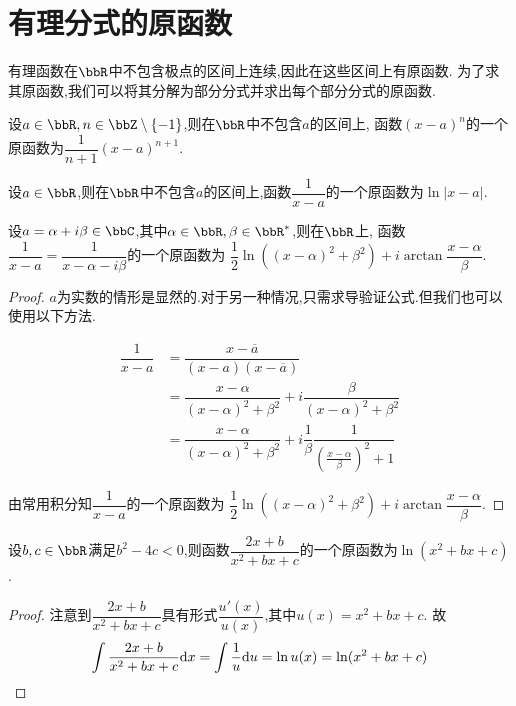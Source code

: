 \section{有理分式的原函数}

有理函数在$\bbR$中不包含极点的区间上连续,因此在这些区间上有原函数.
为了求其原函数,我们可以将其分解为部分分式并求出每个部分分式的原函数.

\begin{prop}
    设$a \in \bbR, n \in \bbZ \setminus \{ -1 \}$,则在$\bbR$中不包含$a$的区间上,
    函数$(x - a)^n$的一个原函数为$\dfrac{1}{n + 1} (x - a)^{n + 1}$.
\end{prop}

\begin{prop}
    设$a \in \bbR$,则在$\bbR$中不包含$a$的区间上,函数$\dfrac{1}{x - a}$的一个原函数为$\ln \lvert x - a \rvert$.
\end{prop}

\begin{prop}
    设$a = \alpha + i \beta \in \bbC$,其中$\alpha \in \bbR, \beta \in \bbR^*$,则在$\bbR$上,
    函数$\dfrac{1}{x - a} = \dfrac{1}{x - \alpha - i \beta}$的一个原函数为
    $\dfrac{1}{2} \ln \left( (x - \alpha)^2 + \beta^2 \right) + i \arctan \dfrac{x - \alpha}{\beta}$.
\end{prop}

\begin{proof}
    $a$为实数的情形是显然的.对于另一种情况,只需求导验证公式.但我们也可以使用以下方法.

    \begin{align*}
        \dfrac{1}{x - a} & = \dfrac{x - \overline{a}}{(x - a)(x - \overline{a})} \\
        & = \dfrac{x - \alpha}{(x - \alpha)^2 + \beta^2} + i \dfrac{\beta}{(x - \alpha)^2 + \beta^2} \\
        & = \dfrac{x - \alpha}{(x - \alpha)^2 + \beta^2} + i \dfrac{1}{\beta} \dfrac{1}{(\frac{x - \alpha}{\beta})^2 + 1}
    \end{align*}

    由常用积分知$\dfrac{1}{x - a}$的一个原函数为
    $\dfrac{1}{2} \ln \left( (x - \alpha)^2 + \beta^2 \right) + i \arctan \dfrac{x - \alpha}{\beta}$.
\end{proof}

\begin{prop}
    设$b, c \in \bbR$满足$b^2 - 4c < 0$,则函数$\dfrac{2x + b}{x^2 + bx + c}$的一个原函数为$\ln (x^2 + bx +c)$.
\end{prop}

\begin{proof}
    注意到$\dfrac{2x + b}{x^2 + bx + c}$具有形式$\dfrac{u'(x)}{u(x)}$,其中$u(x) = x^2 + bx + c$.
    故\[ \int \dfrac{2x + b}{x^2 + bx + c} \mathrm{d} x = \int \dfrac{1}{u} \mathrm{d} u = \ln u(x) = \ln (x^2 + bx + c) \qedhere \]
\end{proof}

